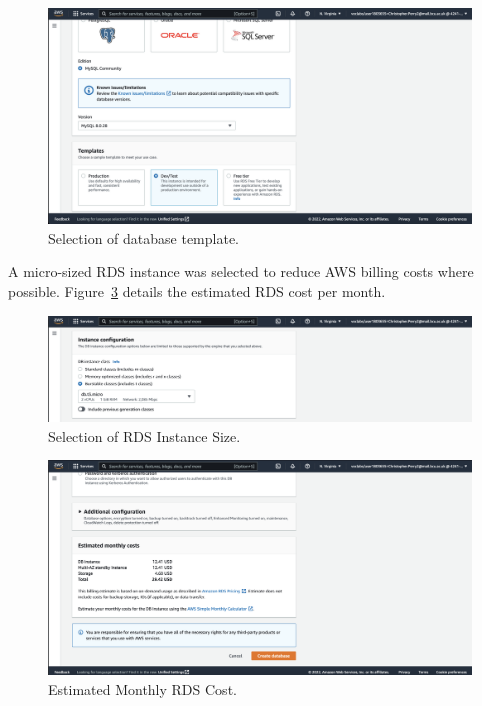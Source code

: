 \begin{figure}[!htbp]
    \centering
    \includegraphics[width=\textwidth]{resources/rds/rds-templates}
    \caption{Selection of database template.}
    \label{fig:rds-templates}
\end{figure}

\clearpage
A micro-sized RDS instance was selected to reduce AWS billing costs where possible.
Figure~\ref{fig:rds-costs} details the estimated RDS cost per month.

\begin{figure}[!htbp]
    \centering
    \includegraphics[width=125mm]{resources/rds/rds-instance-config}
    \caption{Selection of RDS Instance Size.}
    \label{fig:rds-instance-conf}
\end{figure}

\begin{figure}[!htbp]
    \centering
    \includegraphics[width=125mm]{resources/rds/rds-monthly-costs}
    \caption{Estimated Monthly RDS Cost.}
    \label{fig:rds-costs}
\end{figure}

